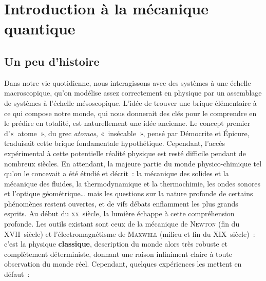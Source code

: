 \documentclass[../main/main.tex]{subfiles}
\begin{document}
\setcounter{chapter}{0}
\chapter{Introduction \`a la m\'ecanique quantique}
\label{ch:mecaq}

\section{Un peu d'histoire}
\label{sec:mqhistoire}
Dans notre vie quotidienne, nous interagissons avec des systèmes à une échelle
macroscopique, qu'on modélise assez correctement en physique par un assemblage
de systèmes à l'échelle mésoscopique. L'idée de trouver une brique élémentaire à
ce qui compose notre monde, qui nous donnerait des clés pour le comprendre en le
prédire en totalité, est naturellement une idée ancienne. Le concept premier
d'«~atome~», du grec \textit{atomos}, «~insécable~», pensé par Démocrite et
Épicure, traduisait cette brique fondamentale hypothétique. Cependant, l'accès
expérimental à cette potentielle réalité physique est resté difficile pendant
de nombreux siècles.
\bigbreak
En attendant, la majeure partie du monde physico-chimique tel qu'on le concevait
a été étudié et décrit~: la mécanique des solides et la mécanique des fluides,
la thermodynamique et la thermochimie, les ondes sonores et l'optique
géométrique… mais les questions sur la nature profonde de certains phénomènes
restent ouvertes, et de vifs débats enflamment les plus grands esprits.
\bigbreak
Au début du \textsc{xx}\ieme\ siècle, la lumière échappe à cette compréhension
profonde. Les outils existant sont ceux de la mécanique de \textsc{Newton} (fin
du \textsc{XVII}\ieme\ siècle) et l'électromagnétisme de \textsc{Maxwell}
(milieu et fin du \textsc{XIX}\ieme\ siècle)~: c'est la physique
\textbf{classique}, description du monde alors très robuste et complètement
déterministe, donnant une raison infiniment claire à toute observation du monde
réel. Cependant, quelques expériences les mettent en défaut~:
\end{document}
